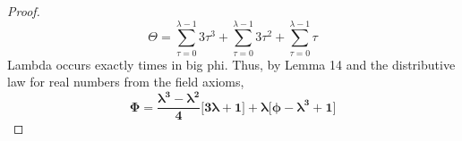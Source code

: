 \documentclass[preview]{standalone}
\begin{document}
\begin{proof}
\begin{equation*}
        \Theta 
            = 
        \sum_{\tau=0}^{\lambda - 1} 3 \tau ^3
            +
        \sum_{\tau=0}^{\lambda - 1} 3 \tau ^2
            +
        \sum_{\tau=0}^{\lambda - 1} \tau
    \end{equation*}
    Lambda occurs exactly  
    times in big phi. 
    Thus, by Lemma 14
    and the distributive law for real numbers from the field axioms,
    \begin{equation*}
        \bm{
            \Phi
                =
            \frac{
                \lambda ^3 - \lambda ^2
            }
            {4}
            \Bigg[ 3 \lambda + 1 \Bigg]
                + 
            \lambda
            \Bigg[
                \phi - \lambda ^3 + 1
            \Bigg]
        }
    \end{equation*}
\end{proof}
\end{document}
